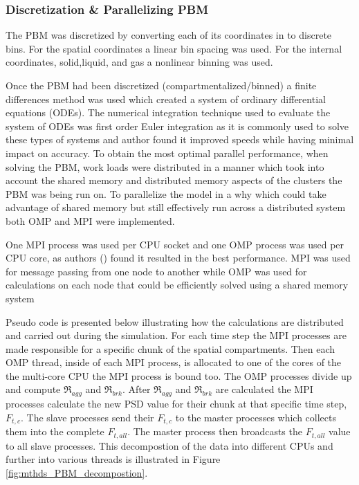 \documentclass[preprint,11pt,authoryear]{elsarticle}
\begin{document}
\subsubsection{Discretization \& Parallelizing PBM}
\par The PBM was discretized by converting each of its coordinates in to discrete bins. For the spatial coordinates a linear bin spacing was used. For the internal coordinates, solid,liquid, and gas a nonlinear binning was used. %
\par Once the PBM had been discretized (compartmentalized/binned) a finite differences method was used which created a system of ordinary differential equations (ODEs). The numerical integration technique used to evaluate the system of ODEs was first order Euler integration as it is commonly used to solve these types of systems and author  found it improved speeds while having minimal impact on accuracy. To obtain the most optimal parallel performance, when solving the PBM, work loads were distributed in a manner which took into account the shared memory and distributed memory aspects of the clusters the PBM was being run on. To parallelize the model in a why which could take advantage of shared memory but still effectively run across a distributed system both OMP and MPI were implemented. 
\par One MPI process was used per CPU socket and one OMP process was used per CPU core, as authors (\cite{Bettencourt2017}) found it resulted in the best performance. MPI was used for message passing from one node to another while OMP was used for calculations on each node that could be efficiently solved using a shared memory system  
\par Pseudo code is presented below illustrating how the calculations are distributed and carried out during the simulation. For each time step the MPI processes are made responsible for a specific chunk of the spatial compartments. Then each OMP thread, inside of each MPI process, is allocated to one of the cores of the the multi-core CPU the MPI process is bound too. The OMP processes divide up and compute $\Re_{agg}$ and $\Re_{brk}$. After $\Re_{agg}$ and $\Re_{brk}$ are calculated the MPI processes calculate the new PSD value for their chunk at that specific time step, $F_{t,c}$. The slave processes send their $F_{t,c}$ to the master processes which collects them into the complete $F_{t,all}$. The master process then broadcasts the $F_{t,all}$ value to all slave processes. This decompostion of the data into different CPUs and further into various threads is illustrated in Figure \ref{fig:mthds_PBM_decompostion}.	
\end{document}
